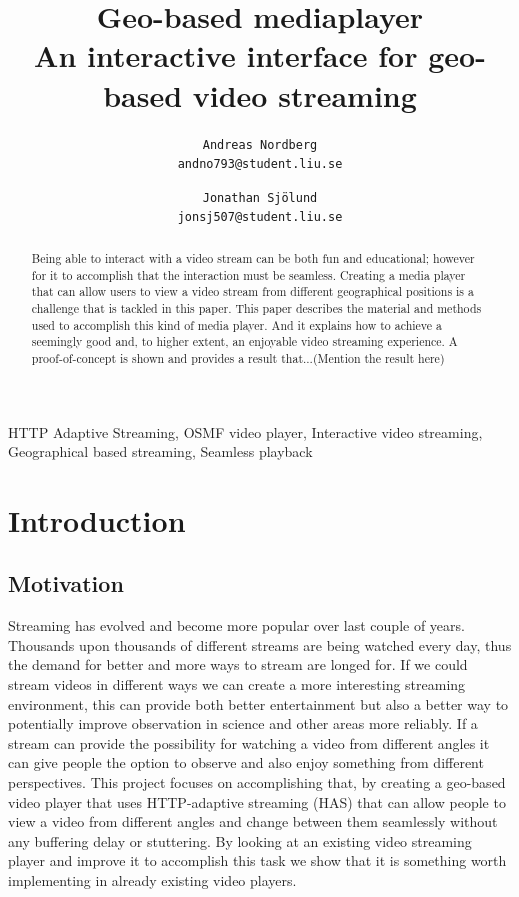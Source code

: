 \documentclass[9pt,a4paper]{acmproc}
\author{
\texttt{Andreas Nordberg}\\
\texttt{andno793@student.liu.se}
  \and
  \texttt{Jonathan Sjölund}\\
  \texttt{jonsj507@student.liu.se}
}
\begin{document}
\title{%
	Geo-based mediaplayer \\
	\large An interactive interface for geo-based video streaming}
\maketitle

\cleardoublepage
{}
\setcounter{page}{2}

\begin{abstract}
Being able to interact with a video stream can be both fun and educational; however for it to accomplish that the interaction must be seamless. Creating a media player that can allow users to view a video stream from different geographical positions is a challenge that is tackled in this paper. This paper describes the material and methods used to accomplish this kind of media player. And it explains how to achieve a seemingly good and, to higher extent, an enjoyable video streaming experience. A proof-of-concept is shown and provides a result that...(Mention the result here)

\end{abstract}

\begin{keywords}
HTTP Adaptive Streaming, OSMF video player, Interactive video streaming, Geographical based streaming, Seamless playback
\end{keywords}

\section{Introduction} 

\subsection{Motivation}
Streaming has evolved and become more popular over last couple of years. Thousands upon thousands of different streams are being watched every day, thus the demand for better and more ways to stream are longed for. If we could stream videos in different ways we can create a more interesting streaming environment, this can provide both better entertainment but also a better way to potentially improve observation in science and other areas more reliably. If a stream can provide the possibility for watching a video from different angles it can give people the option to observe and also enjoy something from different perspectives. This project focuses on accomplishing that, by creating a geo-based video player that uses HTTP-adaptive streaming (HAS) that can allow people to view a video from different angles and change between them seamlessly without any buffering delay or stuttering. By looking at an existing video streaming player and improve it to accomplish this task we show that it is something worth implementing in already existing video players.
\end{document}
